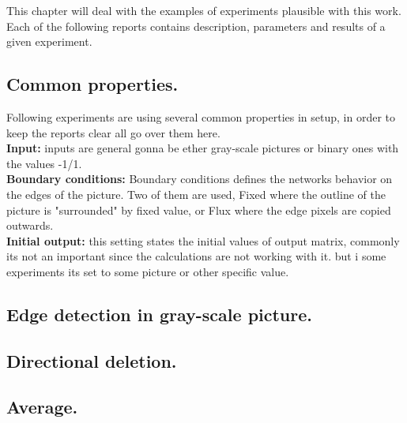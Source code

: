 This chapter will deal with the examples of experiments plausible with this work. 
Each of the following reports contains description, parameters and results of a given experiment.
\subsection{Common properties.}
Following experiments are using several common properties in setup, in order to keep the reports clear all go over them here.\\
\textbf{Input:} inputs are general gonna be ether gray-scale pictures or binary ones with the values -1/1.\\
\textbf{Boundary conditions:} Boundary conditions defines the networks behavior on the edges of the picture. Two of them are used, Fixed where the outline of the picture is "surrounded" by fixed value, or Flux where the edge pixels are copied outwards. \\
\textbf{Initial output:} this setting states the initial values of output matrix, commonly its not an important since the calculations are not working with it. but i some experiments its set to some picture or other specific value.  \\

\newpage
\subsection{Edge detection in gray-scale picture.}


\newpage
\subsection{Directional deletion.}


\newpage
\subsection{Average.}


